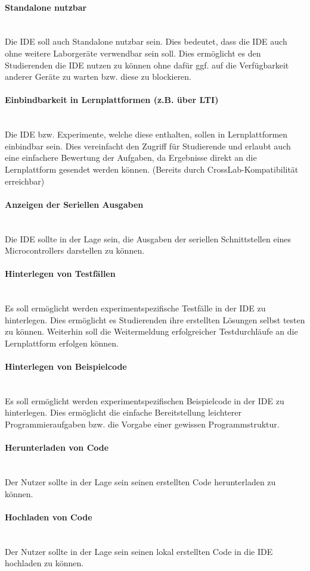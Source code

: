 \paragraph{Standalone nutzbar} \mbox{} \\
Die IDE soll auch Standalone nutzbar sein. Dies bedeutet, dass die IDE auch ohne weitere Laborgeräte verwendbar sein soll. Dies ermöglicht es den Studierenden die IDE nutzen zu können ohne dafür ggf. auf die Verfügbarkeit anderer Geräte zu warten bzw. diese zu blockieren.

\paragraph{Einbindbarkeit in Lernplattformen (z.B. über LTI)} \mbox{} \\
Die IDE bzw. Experimente, welche diese enthalten, sollen in Lernplattformen einbindbar sein. Dies vereinfacht den Zugriff für Studierende und erlaubt auch eine einfachere Bewertung der Aufgaben, da Ergebnisse direkt an die Lernplattform gesendet werden können. (Bereits durch CrossLab-Kompatibilität erreichbar)

\paragraph{Anzeigen der Seriellen Ausgaben} \mbox{} \\
Die IDE sollte in der Lage sein, die Ausgaben der seriellen Schnittstellen eines Microcontrollers darstellen zu können.

\paragraph{Hinterlegen von Testfällen} \mbox{} \\
Es soll ermöglicht werden experimentspezifische Testfälle in der IDE zu hinterlegen. Dies ermöglicht es Studierenden ihre erstellten Lösungen selbst testen zu können. Weiterhin soll die Weitermeldung erfolgreicher Testdurchläufe an die Lernplattform erfolgen können.

\paragraph{Hinterlegen von Beispielcode} \mbox{} \\
Es soll ermöglicht werden experimentspezifischen Beispielcode in der IDE zu hinterlegen. Dies ermöglicht die einfache Bereitstellung leichterer Programmieraufgaben bzw. die Vorgabe einer gewissen Programmstruktur.

\paragraph{Herunterladen von Code} \mbox{} \\
Der Nutzer sollte in der Lage sein seinen erstellten Code herunterladen zu können.

\paragraph{Hochladen von Code} \mbox{} \\
Der Nutzer sollte in der Lage sein seinen lokal erstellten Code in die IDE hochladen zu können.